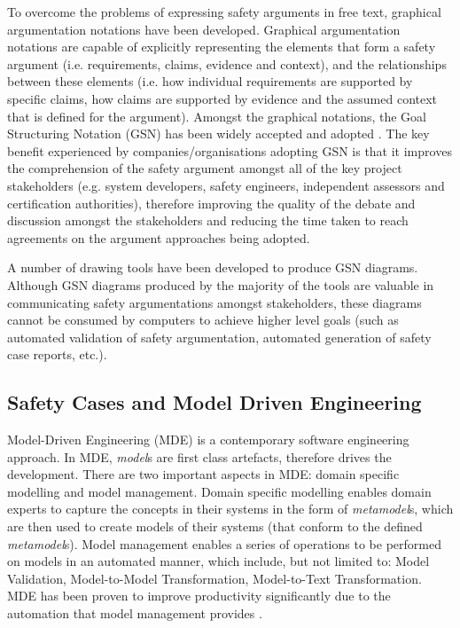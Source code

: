 To overcome the problems of expressing safety arguments in free text, graphical argumentation notations have been developed. Graphical argumentation notations are capable of explicitly representing the elements that form a safety argument (i.e. requirements, claims, evidence and context), and the relationships between these elements (i.e. how individual requirements are supported by specific claims, how claims are supported by evidence and the assumed context that is defined for the argument). 
Amongst the graphical notations, the Goal Structuring Notation (GSN) \cite{kelly2004goal} has been widely accepted and adopted \cite{chinneck2004turning}. 
The key benefit experienced by companies/organisations adopting GSN is that it improves the comprehension of the safety argument amongst all of the key project stakeholders (e.g. system developers, safety engineers, independent assessors and certification authorities), therefore improving the quality of the debate and discussion amongst the stakeholders and reducing the time taken to reach agreements on the argument approaches being adopted.

A number of drawing tools have been developed \cite{} to produce GSN diagrams. Although GSN diagrams produced by the majority of the tools are valuable in communicating safety argumentations amongst stakeholders, these diagrams cannot be consumed by computers to achieve higher level goals (such as automated validation of safety argumentation, automated generation of safety case reports, etc.). 


\subsection{Safety Cases and Model Driven Engineering}
Model-Driven Engineering (MDE) is a contemporary software engineering approach. In MDE, \textit{model}s are first class artefacts, therefore drives the development. There are two important aspects in MDE: domain specific modelling and model management. Domain specific modelling enables domain experts to capture the concepts in their systems in the form of \textit{metamodel}s, which are then used to create models of their systems (that conform to the defined \textit{metamodel}s). Model management enables a series of operations to be performed on models in an automated manner, which include, but not limited to: Model Validation, Model-to-Model Transformation, Model-to-Text Transformation. MDE has been proven to improve productivity significantly due to the automation that model management provides \cite{}. 

